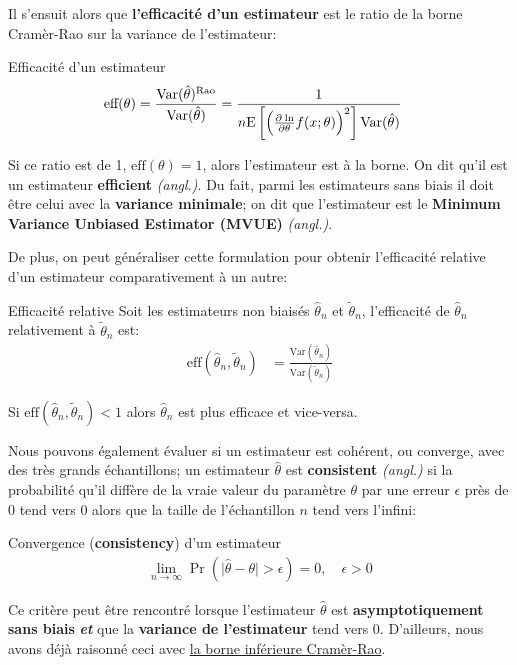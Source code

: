 \documentclass[10pt, french]{article}
\begin{document}
\begin{multicols*}{2}
Il s'ensuit alors que \textbf{l'efficacité d'un estimateur} est le ratio de la borne Cramèr-Rao sur la variance de l'estimateur:
\begin{algo}{Efficacité d'un estimateur}
\begin{align*}
	\text{eff}(\theta)
	&=	\frac{\text{Var}(\hat{\theta})^{\text{Rao}}}{\text{Var}(\hat{\theta})} 
	=	\frac{1}{n\text{E}\left[\Big(\frac{\partial^{}\ln}{\partial \theta^{}} f(x ; \theta)\Big)^{2}\right]\text{Var}(\hat{\theta})}
\end{align*}
\end{algo}

Si ce ratio est de 1, $\text{eff}(\theta) = 1$, alors l'estimateur est à la borne. On dit qu'il est un estimateur \og \textbf{efficient} \fg{} \textit{(angl.)}. Du fait, parmi les estimateurs sans biais il doit être celui avec la \textbf{variance minimale}; on dit que l'estimateur est le \og \textbf{Minimum Variance Unbiased Estimator (MVUE)} \fg{} \textit{(angl.)}. 

De plus, on peut généraliser cette formulation pour obtenir l'efficacité relative d'un estimateur comparativement à un autre:
\begin{algo}{Efficacité relative}
Soit les estimateurs non biaisés $\hat\theta_{n}$ et $\tilde\theta_{n}$, l'efficacité de $\hat\theta_{n}$ relativement à $\tilde\theta_{n}$ est:
\begin{align*}
	\text{eff}(\hat\theta_{n}, \tilde\theta_{n})
	&=	\frac{\text{Var}(\hat\theta_{n})}{\text{Var}(\tilde\theta_{n})}	
\end{align*}
\end{algo}
Si $\text{eff}(\hat\theta_{n}, \tilde\theta_{n}) < 1$ alors $\hat\theta_{n}$ est plus efficace et vice-versa.

Nous pouvons également évaluer si un estimateur est cohérent, ou converge, avec des très grands échantillons; un estimateur $\hat\theta$ est \textbf{consistent} \textit{(angl.)} si la probabilité qu'il diffère de la vraie valeur du paramètre $\theta$ par une erreur $\epsilon$ près de 0 tend vers 0 alors que la taille de l'échantillon $n$ tend vers l'infini:
\begin{algo}{Convergence (\textbf{consistency}) d'un estimateur}
\begin{align*}
	\underset{n \rightarrow \infty}{\lim} \Pr(\big| \hat\theta - \theta \big| > \epsilon) = 0, \quad \epsilon > 0
\end{align*}
\end{algo}

Ce critère peut être rencontré lorsque l'estimateur $\hat\theta$ est \hypertarget{asympto}{\textbf{asymptotiquement sans biais}} \textbf{\textit{et}} que la \textbf{variance de l'estimateur} tend vers 0. D'ailleurs, nous avons déjà raisonné ceci avec \hyperlink{cramer-rao}{la borne inférieure Cramèr-Rao}.



\end{multicols*}
\end{document}
